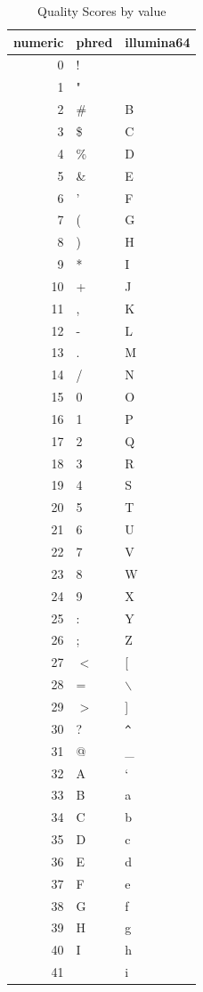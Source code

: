 \documentclass{article}
\begin{document}
\begin{center}
\begin{table}[tbp]
\begin{center}
\caption{Quality Scores by value}
\label{table:qual}
\begin{tabular}{rll}
  \hline
numeric & phred & illumina64 \\ 
  \hline
  0 & ! &  \\ 
    1 & " &  \\ 
    2 & \# & B \\ 
    3 & \$ & C \\ 
    4 & \% & D \\ 
    5 & \& & E \\ 
    6 & ' & F \\ 
    7 & ( & G \\ 
    8 & ) & H \\ 
    9 & * & I \\ 
   10 & + & J \\ 
   11 & , & K \\ 
   12 & - & L \\ 
   13 & . & M \\ 
   14 & / & N \\ 
   15 & 0 & O \\ 
   16 & 1 & P \\ 
   17 & 2 & Q \\ 
   18 & 3 & R \\ 
   19 & 4 & S \\ 
   20 & 5 & T \\ 
   21 & 6 & U \\ 
   22 & 7 & V \\ 
   23 & 8 & W \\ 
   24 & 9 & X \\ 
   25 & : & Y \\ 
   26 & ; & Z \\ 
   27 & $<$ & [ \\ 
   28 & = & $\backslash$ \\ 
   29 & $>$ & ] \\ 
   30 & ? & \verb|^| \\ 
   31 & @ & \_ \\ 
   32 & A & ` \\ 
   33 & B & a \\ 
   34 & C & b \\ 
   35 & D & c \\ 
   36 & E & d \\ 
   37 & F & e \\ 
   38 & G & f \\ 
   39 & H & g \\ 
   40 & I & h \\ 
   41 &  & i \\ 
   \hline
\end{tabular}
\end{center}
\end{table}
\end{center}
\end{document}
